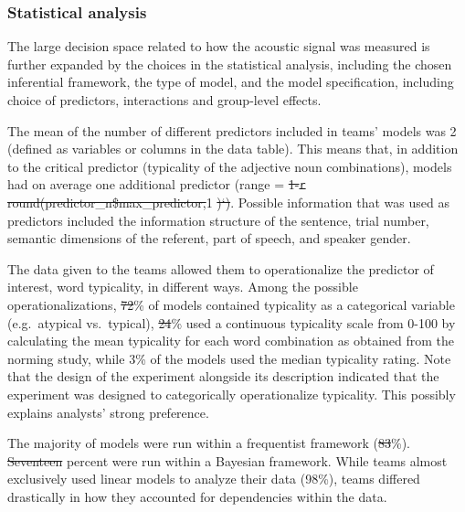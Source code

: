 \documentclass[Review,times,sageh]{sagej}
\providecommand{\DIFaddtex}[1]{{\protect\color{blue}\uwave{#1}}} %
\providecommand{\DIFdeltex}[1]{{\protect\color{red}\sout{#1}}}                      %
\providecommand{\DIFaddbegin}{} %
\providecommand{\DIFaddend}{} %
\providecommand{\DIFdelbegin}{} %
\providecommand{\DIFdelend}{} %
\providecommand{\DIFadd}[1]{\texorpdfstring{\DIFaddtex{#1}}{#1}} %
\providecommand{\DIFdel}[1]{\texorpdfstring{\DIFdeltex{#1}}{}} %
\begin{document}
\hypertarget{statistical-analysis}{%
\subsubsection{Statistical analysis}\label{statistical-analysis}}

The large decision space related to how the acoustic signal was measured is further expanded by the choices in the statistical analysis, including the chosen inferential framework, the type of model, and the model specification, including choice of predictors, interactions and group-level effects.

The mean of the number of different predictors included in teams' models was 2 (defined as variables or columns in the data table).
This means that, in addition to the critical predictor (typicality of the adjective noun combinations), models had on average one additional predictor (range = \DIFdelbegin \DIFdel{1-}\texttt{\DIFdel{r}}%
\DIFdel{round(predictor\_n\$max\_predictor,}\DIFdelend 1 \DIFdelbegin \DIFdel{)`)}\DIFdelend \DIFaddbegin \DIFadd{- 5)}\DIFaddend .
Possible information that was used as predictors included the information structure of the sentence, trial number, semantic dimensions of the referent, part of speech, and speaker gender.

The data given to the teams allowed them to operationalize the predictor of interest, word typicality, in different ways.
Among the possible operationalizations, \DIFdelbegin \DIFdel{72}\DIFdelend \DIFaddbegin \DIFadd{69}\DIFaddend \% of models contained typicality as a categorical variable (e.g.~atypical vs.~typical), \DIFdelbegin \DIFdel{24}\DIFdelend \DIFaddbegin \DIFadd{28}\DIFaddend \% used a continuous typicality scale from 0-100 by calculating the mean typicality for each word combination as obtained from the norming study, while 3\% of the models used the median typicality rating.
Note that the design of the experiment alongside its description indicated that the experiment was designed to categorically operationalize typicality. This possibly explains \DIFaddbegin \DIFadd{the }\DIFaddend analysts' strong preference.

The majority of models were run within a frequentist framework (\DIFdelbegin \DIFdel{83}\DIFdelend \DIFaddbegin \DIFadd{84}\DIFaddend \%).
\DIFdelbegin \DIFdel{Seventeen }\DIFdelend \DIFaddbegin \DIFadd{Sixteen }\DIFaddend percent were run within a Bayesian framework.
While teams almost exclusively used linear models to analyze their data (98\%), teams differed drastically in how they accounted for dependencies within the data.
\end{document}
